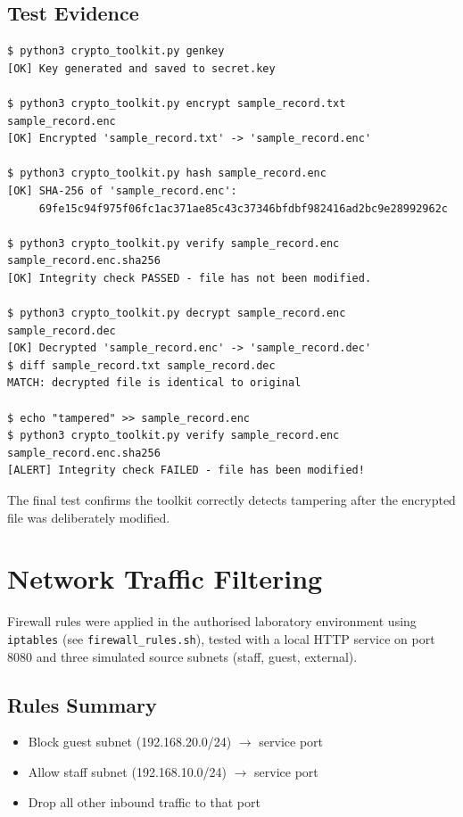 \documentclass[11pt]{article}
\begin{document}
\subsection{Test Evidence}
\begin{lstlisting}
$ python3 crypto_toolkit.py genkey
[OK] Key generated and saved to secret.key

$ python3 crypto_toolkit.py encrypt sample_record.txt sample_record.enc
[OK] Encrypted 'sample_record.txt' -> 'sample_record.enc'

$ python3 crypto_toolkit.py hash sample_record.enc
[OK] SHA-256 of 'sample_record.enc':
     69fe15c94f975f06fc1ac371ae85c43c37346bfdbf982416ad2bc9e28992962c

$ python3 crypto_toolkit.py verify sample_record.enc sample_record.enc.sha256
[OK] Integrity check PASSED - file has not been modified.

$ python3 crypto_toolkit.py decrypt sample_record.enc sample_record.dec
[OK] Decrypted 'sample_record.enc' -> 'sample_record.dec'
$ diff sample_record.txt sample_record.dec
MATCH: decrypted file is identical to original

$ echo "tampered" >> sample_record.enc
$ python3 crypto_toolkit.py verify sample_record.enc sample_record.enc.sha256
[ALERT] Integrity check FAILED - file has been modified!
\end{lstlisting}

The final test confirms the toolkit correctly detects tampering after the encrypted file was deliberately modified.

\section{Network Traffic Filtering}
Firewall rules were applied in the authorised laboratory environment using \texttt{iptables} (see \texttt{firewall\_rules.sh}), tested with a local HTTP service on port 8080 and three simulated source subnets (staff, guest, external).

\subsection{Rules Summary}
\begin{itemize}
  \item Block guest subnet (192.168.20.0/24) $\rightarrow$ service port
  \item Allow staff subnet (192.168.10.0/24) $\rightarrow$ service port
  \item Drop all other inbound traffic to that port
\end{itemize}
\end{document}
